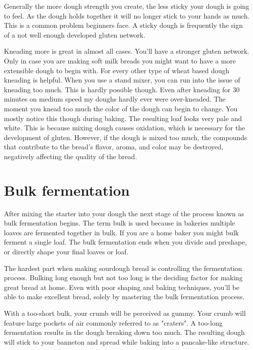 Generally the more dough strength you create, the less sticky your dough is going to
feel. As the dough holds together it will no longer stick to your hands as
much. This is a common problem beginners face. A sticky dough is frequently
the sign of a not well enough developed gluten network.

Kneading more is great in almost all cases. You'll have a stronger
gluten network. Only in case you are making soft milk breads you
might want to have a more extensible dough to begin with. For every
other type of wheat based dough kneading is helpful. When you use
a stand mixer, you can run into the issue of kneading too much. This
is hardly possible though. Even after kneading for 30 minutes on medium
speed my doughs hardly ever were over-kneaded. The moment you knead
too much the color of the dough can begin to change. You mostly
notice this though during baking. The resulting loaf looks very
pale and white. This is because mixing dough causes oxidation,
which is necessary for the development of gluten.
However, if the dough is mixed too much, the compounds that contribute
to the bread's flavor, aroma, and color may be destroyed, negatively
affecting the quality of the bread.\cite{oxidization+dough}

\section{Bulk fermentation}

After mixing the starter into your dough the next stage of
the process known as bulk fermentation begins. The term
bulk is used because in bakeries multiple loaves are fermented
together in bulk. If you are a home baker you might bulk
ferment a single loaf. The bulk fermentation ends when you
divide and preshape, or directly shape your final loaves or loaf.

The hardest part when making sourdough bread is controlling
the fermentation process. Bulking long enough but not too
long is the deciding factor for making great bread at home.
Even with poor shaping and baking techniques, you'll be able
to make excellent bread, solely by mastering the bulk
fermentation process.

With a too-short bulk, your crumb will be
perceived as gummy. Your crumb will feature large pockets of
air commonly referred to as "craters". A too-long fermentation
results in the dough breaking down too much. The resulting
dough will stick to your banneton and spread while baking
into a pancake-like structure.

